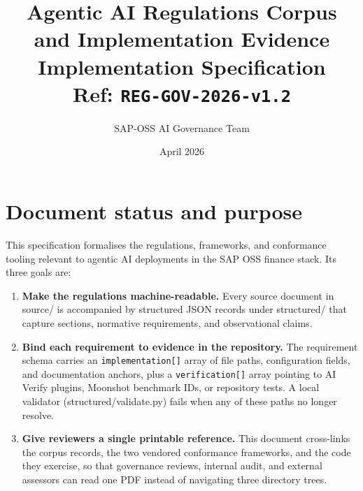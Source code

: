\documentclass[11pt,a4paper,twoside]{report}
\newcommand{\corpus}{}
\begin{document}
\title{\vspace{-2em}\Large Agentic AI Regulations Corpus \\
\textbf{and Implementation Evidence} \\
\large Implementation Specification \\
\small Ref: \texttt{REG-GOV-2026-v1.2}}
\author{SAP-OSS AI Governance Team}
\date{April 2026}

\maketitle



\chapter*{Document status and purpose}

This specification formalises the regulations, frameworks, and conformance
tooling relevant to agentic AI deployments in the SAP OSS finance stack. Its
three goals are:

\begin{enumerate}
\item \textbf{Make the regulations machine-readable.} Every source document
in \corpus{source/} is accompanied by structured JSON records under
\corpus{structured/} that capture sections, normative requirements,
and observational claims.
\item \textbf{Bind each requirement to evidence in the repository.} The
requirement schema carries an \texttt{implementation[]} array of file
paths, configuration fields, and documentation anchors, plus a
\texttt{verification[]} array pointing to AI Verify plugins, Moonshot
benchmark IDs, or repository tests. A local validator
(\corpus{structured/validate.py}) fails when any of these paths no
longer resolve.
\item \textbf{Give reviewers a single printable reference.} This document
cross-links the corpus records, the two vendored conformance
frameworks, and the code they exercise, so that governance reviews,
internal audit, and external assessors can read one PDF instead of
navigating three directory trees.
\end{enumerate}
\end{document}
